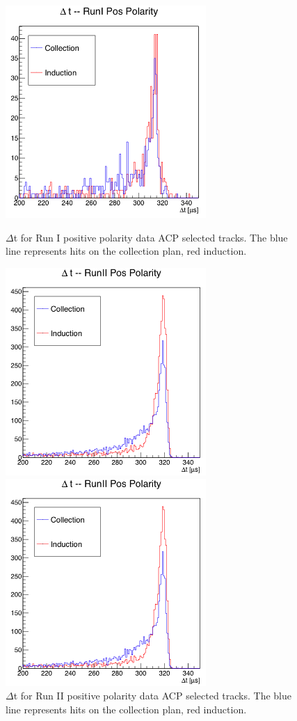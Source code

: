 \begin{figure}[b]
\centering
\begin{minipage}{0.45\textwidth}
\centering
\includegraphics[width=3in]{images/ACPRunIPos.png}
\caption{$\Delta$t for Run I positive polarity data ACP selected tracks. The blue line represents hits on the collection plan, red induction.}
\label{fig:RunIPosACP}
\end{minipage}\hfill
\begin{minipage}{0.45\textwidth}
\centering
\includegraphics[width=3in]{images/ACPRunIIPos.png}
\caption{$\Delta$t for Run II positive polarity data ACP selected tracks.  The blue line represents hits on the collection plan, red induction.}
\label{fig:RunIIPosACP}
\end{minipage}\hfill
\begin{minipage}{0.45\textwidth}
\centering
\includegraphics[width=3in]{images/ACPRunIIPos.png}

\end{minipage}
\end{figure}
